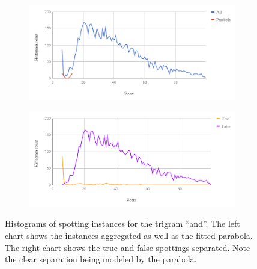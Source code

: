 \documentclass[ms,electronic,twosidetoc,letterpaper,chaptercenter,parttop,lof,lot]{byumsphd}
\begin{document}


\begin{figure}
\centering
    \begin{subfigure}{.89\textwidth}
  		\centering
  		\includegraphics[width=.99\linewidth]{two_dist_ex_All}
	\end{subfigure}
	\begin{subfigure}{.89\textwidth}
  		\centering
  		\includegraphics[width=.99\linewidth]{two_dist_ex_TF}
	\end{subfigure}
    \caption{Histograms of spotting instances for the trigram ``and''. The left chart shows the instances aggregated as well as the fitted parabola. The right chart shows the true and false spottings separated. Note the clear separation being modeled by the parabola.
    }
    \label{fig:two_dist_ex}
\end{figure}
\end{document}
